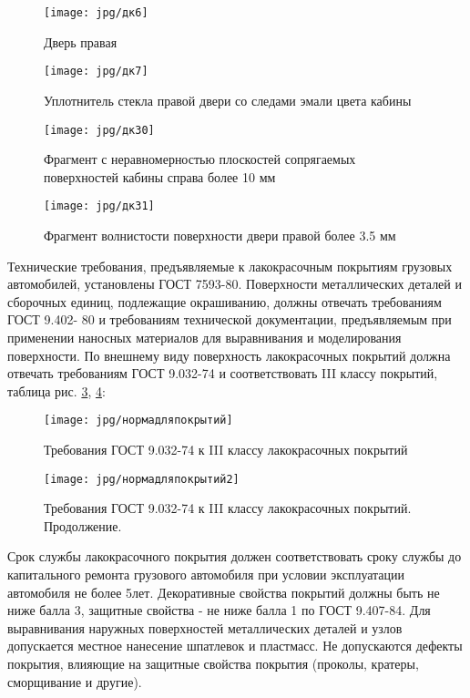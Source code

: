 { \begin{figure}[H]\centering
	\parbox[t]{0.49\textwidth}
	{\centering
		\texttt{[image: jpg/дк6]}
		\caption{\footnotesize {Дверь правая}}
		\label{дверьправая}}
	\hfil \hfil
	\parbox[t]{0.49\textwidth}
	{\centering
		\texttt{[image: jpg/дк7]}
		\caption{\footnotesize {Уплотнитель стекла правой двери со следами эмали цвета кабины}}
		\label{уплотнительсправа}}
\end{figure}

    \begin{figure}[H]\centering
   	\parbox[t]{0.49\textwidth}
   	{\centering
   		\texttt{[image: jpg/дк30]}
   		\caption{\footnotesize {Фрагмент с неравномерностью плоскостей сопрягаемых поверхностей кабины справа более 10 мм}}
   		\label{неравномерностьплоскости}}
   	\hfil \hfil
   	\parbox[t]{0.49\textwidth}
   	{\centering
   		\texttt{[image: jpg/дк31]}
   		\caption{\footnotesize {Фрагмент волнистости поверхности двери правой более 3.5 мм }}
   		\label{волнистость}}
   \end{figure}
   
   
   

   
Технические требования, предъявляемые к лакокрасочным покрытиям грузовых
автомобилей, установлены ГОСТ 7593-80. Поверхности металлических деталей и
сборочных единиц, подлежащие окрашиванию, должны отвечать требованиям ГОСТ 9.402-
80 и требованиям технической документации, предъявляемым при применении наносных
материалов для выравнивания и моделирования поверхности. По внешнему виду
поверхность лакокрасочных покрытий должна отвечать требованиям ГОСТ 9.032-74 и
соответствовать III классу покрытий, таблица рис. \ref{нормап}, \ref{нормап2}:

\begin{figure}[H]
	\centering
	\texttt{[image: jpg/нормадляпокрытий]}
	\caption[]{{\footnotesize Требования ГОСТ 9.032-74 к III классу лакокрасочных покрытий}}
	\label{нормап}
\end{figure}
\begin{figure}[H]
	\centering
	\texttt{[image: jpg/нормадляпокрытий2]}
	\caption[]{{\footnotesize Требования ГОСТ 9.032-74 к III классу лакокрасочных покрытий. Продолжение}.}
	\label{нормап2}
\end{figure}

Срок службы лакокрасочного покрытия должен соответствовать сроку службы до
капитального ремонта грузового автомобиля при условии эксплуатации автомобиля не более
5лет. Декоративные свойства покрытий должны быть не ниже балла 3, защитные свойства -
не ниже балла 1 по ГОСТ 9.407-84. Для выравнивания наружных поверхностей
металлических деталей и узлов допускается местное нанесение шпатлевок и пластмасс. Не
допускаются дефекты покрытия, влияющие на защитные свойства покрытия (проколы,
кратеры, сморщивание и другие).

}
